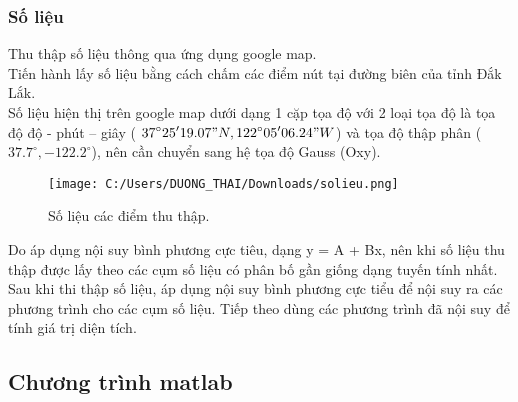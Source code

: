 \documentclass[14pt,a4paper]{article}
\begin{document}
\subsubsection{Số liệu}
Thu thập số liệu thông qua ứng dụng google map.\vspace{6pt}\\
\hspace*{30pt}Tiến hành lấy số liệu bằng cách chấm các điểm nút tại đường biên của tỉnh Đắk Lắk.\vspace{6pt}\\
\hspace*{30pt}Số liệu hiện thị trên google map dưới dạng 1 cặp tọa độ với 2 loại tọa độ là tọa độ độ - phút – giây ( ${\displaystyle 37^{\circ}25'19.07"N, 122^{\circ}05'06.24"W }$) và tọa độ thập phân ( ${\displaystyle 37.7^{\circ}, -122.2^{\circ} }$), nên cần chuyển sang hệ tọa độ Gauss (Oxy).\vspace{6pt}\\
\begin{figure}[H]
	\centering
	
	\texttt{[image: C:/Users/DUONG\_THAI/Downloads/solieu.png]}
	\caption[Số liệu các điểm thu thập. ]{Số liệu các điểm thu thập.}
	\label{hinh32}
\end{figure} \vspace{6pt}
Do áp dụng nội suy bình phương cực tiêu, dạng y = A + Bx, nên khi số liệu thu thập được lấy theo các cụm số liệu có phân bố gần giống dạng tuyến tính nhất.\vspace{6pt}\\
\hspace*{30pt}Sau khi thi thập số liệu, áp dụng nội suy bình phương cực tiểu để nội suy ra các phương trình cho các cụm số liệu. Tiếp theo dùng các phương trình đã nội suy để tính giá trị diện tích.\vspace{6pt}\\
\subsection{Chương trình matlab} 
\end{document}
